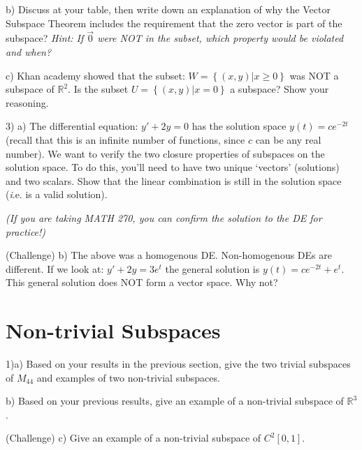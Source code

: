 \documentclass{article}
\begin{document}
\begin{flushleft}
\vspace{2.5in}

b) Discuss at your table, then write down an explanation of why the Vector Subspace Theorem includes the requirement that the zero vector is part of the subspace? \textit{Hint: If $\vec{0}$ were NOT in the subset, which property would be violated and when?}

\vspace{1.5in}

c) Khan academy showed that the subset: $W=\left\{ (x,y)|x\geq 0 \right\}$ was NOT a subspace of $\mathbb{R}^2$.  Is the subset $U=\left\{ (x,y)|x=0 \right\}$ a subspace? Show your reasoning.

\vspace{1.5in}

3) a) The differential equation: $y'+2y=0$ has the solution space $y(t)=ce^{-2t}$ (recall that this is an infinite number of functions, since $c$ can be any real number).  We want to verify the two closure properties of subspaces on the solution space.  To do this, you'll need to have two unique `vectors' (solutions) and two scalars.  Show that the linear combination is still in the solution space ({\emph i.e.} is a valid solution).

\textit{(If you are taking MATH 270, you can confirm the solution to the DE for practice!)}

\vspace{2in}

(Challenge) b) The above was a homogenous DE.  Non-homogenous DEs are different.  If we look at: $y'+2y=3e^t$ the general solution is $y(t)=ce^{-2t}+e^t$. This general solution does NOT form a vector space.  Why not?

\section*{Non-trivial Subspaces}

1)a) Based on your results in the previous section, give the two trivial subspaces of $M_{44}$ and examples of two non-trivial subspaces.

\vspace{2.25in}

b) Based on your previous results, give an example of a non-trivial subspace of $\mathbb{R}^3$.

\vspace{1in}

(Challenge) c) Give an example of a non-trivial subspace of $C^2 [0,1]$.

\end{flushleft}
\end{document}
